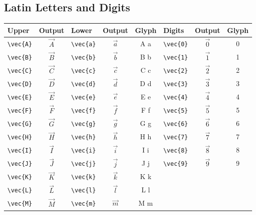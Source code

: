 \documentclass[12pt,a4paper]{article}
\begin{document}
\subsection*{Latin Letters and Digits}
\begin{longtable}{|l|c|l|c|c|l|c|c|}
\hline
\textbf{Upper} & \textbf{Output} & \textbf{Lower} & \textbf{Output} & \textbf{Glyph} & \textbf{Digits} & \textbf{Output} & \textbf{Glyph} \\
\hline
\verb|\vec{A}| & $\vec{A}$       & \verb|\vec{a}| & $\vec{a}$       & A⃗ a⃗            & \verb|\vec{0}|  & $\vec{0}$       & 0⃗ \\
\verb|\vec{B}| & $\vec{B}$       & \verb|\vec{b}| & $\vec{b}$       & B⃗ b⃗            & \verb|\vec{1}|  & $\vec{1}$       & 1⃗ \\
\verb|\vec{C}| & $\vec{C}$       & \verb|\vec{c}| & $\vec{c}$       & C⃗ c⃗            & \verb|\vec{2}|  & $\vec{2}$       & 2⃗ \\
\verb|\vec{D}| & $\vec{D}$       & \verb|\vec{d}| & $\vec{d}$       & D⃗ d⃗            & \verb|\vec{3}|  & $\vec{3}$       & 3⃗ \\
\verb|\vec{E}| & $\vec{E}$       & \verb|\vec{e}| & $\vec{e}$       & E⃗ e⃗            & \verb|\vec{4}|  & $\vec{4}$       & 4⃗ \\
\verb|\vec{F}| & $\vec{F}$       & \verb|\vec{f}| & $\vec{f}$       & F⃗ f⃗            & \verb|\vec{5}|  & $\vec{5}$       & 5⃗ \\
\verb|\vec{G}| & $\vec{G}$       & \verb|\vec{g}| & $\vec{g}$       & G⃗ g⃗            & \verb|\vec{6}|  & $\vec{6}$       & 6⃗ \\
\verb|\vec{H}| & $\vec{H}$       & \verb|\vec{h}| & $\vec{h}$       & H⃗ h⃗            & \verb|\vec{7}|  & $\vec{7}$       & 7⃗ \\
\verb|\vec{I}| & $\vec{I}$       & \verb|\vec{i}| & $\vec{i}$       & I⃗ i⃗            & \verb|\vec{8}|  & $\vec{8}$       & 8⃗ \\
\verb|\vec{J}| & $\vec{J}$       & \verb|\vec{j}| & $\vec{j}$       & J⃗ j⃗            & \verb|\vec{9}|  & $\vec{9}$       & 9⃗ \\
\verb|\vec{K}| & $\vec{K}$       & \verb|\vec{k}| & $\vec{k}$       & K⃗ k⃗            &                 &                 & \\
\verb|\vec{L}| & $\vec{L}$       & \verb|\vec{l}| & $\vec{l}$       & L⃗ l⃗            &                 &                 & \\
\verb|\vec{M}| & $\vec{M}$       & \verb|\vec{m}| & $\vec{m}$       & M⃗ m⃗            &                 &                 & \\

\end{longtable}
\end{document}
